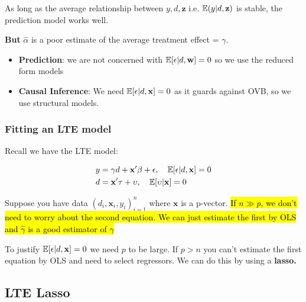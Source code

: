 \documentclass[11pt]{article}
\begin{document}
As long as the average relationship between $y, d, \mathbf{z}$ i.e. $\mathbb{E}(y|d,\mathbf{z})$ is stable, the prediction model works well.

\begin{note}
    \textbf{But} $\hat{\alpha}$ is a poor estimate of the average treatment effect = $\gamma$.
\end{note}

\begin{shaded}
    \begin{itemize}
        \item \textbf{Prediction}: we are not concerned with $\mathbb{E}[\epsilon|d, \mathbf{w}]=0$ so we use the reduced form models
        \item \textbf{Causal Inference}: We need $\mathbb{E}[\epsilon|d,\mathbf{x}]=0$ as it guards against OVB, so we use structural models. 
    \end{itemize}
\end{shaded}

\subsubsection{Fitting an LTE model}

\begin{procedure}
    Recall we have the LTE model:

    \begin{align*}
    y &= \gamma d + \mathbf{x^\prime}\beta + \epsilon, \quad \mathbb{E}[\epsilon|d,\mathbf{x}] = 0 \\
    d &= \mathbf{x^\prime}\tau + \upsilon, \quad \mathbb{E}[\upsilon|\mathbf{x}] = 0
\end{align*}

Suppose you have data $(d_i, \mathbf{x}_i, y_i)_{i=1}^n$ where $\mathbf{x}$ is a p-vector. \hl{If $n\gg p$, we don't need to worry about the second equation. We can just estimate the first by OLS and $\hat{\gamma}$ is a good estimator of $\gamma$}

\begin{note}
    To justify $\mathbb{E}[\epsilon|d,\mathbf{x}]=0$ we need $p$ to be large. If $p>n$ you can't estimate the first equation by OLS and need to select regressors. We can do this by using a \textbf{lasso.}
\end{note}
\end{procedure}

\subsection{LTE Lasso}
\end{document}
